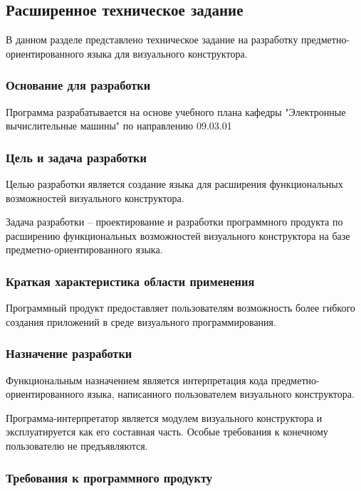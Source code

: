 \subsection{Расширенное техническое задание}

В данном разделе представлено техническое задание на разработку предметно-ориентированного языка для визуального конструктора.

\subsubsection{Основание для разработки}

Программа разрабатывается на основе учебного плана кафедры
"Электронные вычислительные машины" по направлению 09.03.01

\subsubsection{Цель и задача разработки}

Целью разработки является создание языка для расширения
функциональных возможностей визуального конструктора.

Задача разработки -- проектирование и разработки программного продукта по расширению функциональных возможностей визуального конструктора
на базе предметно-ориентированного языка. 

\subsubsection{Краткая характеристика области применения}

Программный продукт предоставляет пользователям возможность более гибкого создания приложений в среде визуального программирования.

\subsubsection{Назначение разработки}

Функциональным назначением является интерпретация кода предметно-ориентированного языка, написанного пользователем визуального конструктора.

Программа-интерпретатор является модулем визуального конструктора и эксплуатируется как его составная часть.
Особые требования к конечному пользователю не предъявляются.

\subsubsection{Требования к программного продукту}

